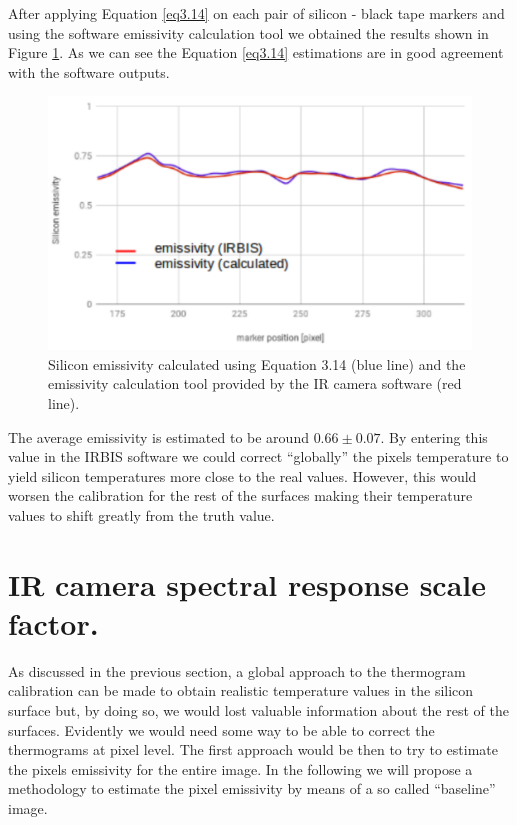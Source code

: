 		After applying Equation \ref{eq3.14} on each pair of silicon - black tape markers and using the software emissivity calculation tool we obtained the results shown in Figure \ref{fig4.6}. As we can see the Equation \ref{eq3.14} estimations are in good agreement with the software outputs. 
		
		\begin{figure}[ht!]
			\centering
			\captionsetup{justification=centering,margin=2cm}
			\includegraphics[scale=0.35]{Figures/Chapter04/SiliconEmissivityCalculatedVSIRBIS.pdf}
			\caption{Silicon emissivity calculated using Equation 3.14 (blue line) and the emissivity calculation tool provided by the IR camera software (red line).}\label{fig4.6}
		\end{figure}
		
		The average emissivity is estimated to be around $0.66 \pm 0.07$. By entering this value in the IRBIS software we could correct “globally” the pixels temperature to yield silicon temperatures more close to the real values. However, this would worsen the calibration for the rest of the surfaces making their temperature values to shift greatly from the truth value.
	
	\section{IR camera spectral response scale factor.}\label{section4.4}
	
		As discussed in the previous section, a global approach to the thermogram calibration can be made to obtain realistic temperature values in the silicon surface but, by doing so, we would lost valuable information about the rest of the surfaces. Evidently we would need some way to be able to correct the thermograms at pixel level. The first approach would be then to try to estimate the pixels emissivity for the entire image. In the following we will propose a methodology to estimate the pixel emissivity by means of a so called “baseline” image. 
		
